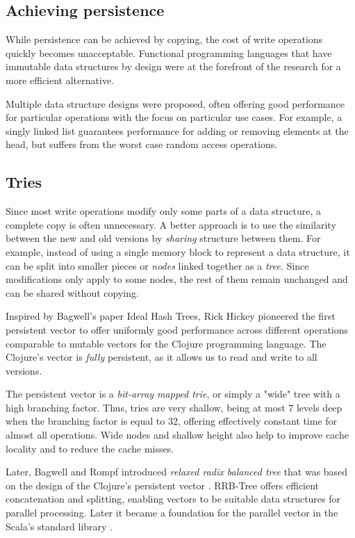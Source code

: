 \subsection{Achieving persistence}
While persistence can be achieved by copying, the cost of write operations quickly becomes unacceptable. Functional programming languages that have immutable data structures by design were at the forefront of the research for a more efficient alternative.

Multiple data structure designs were proposed, often offering good performance for particular operations with the focus on particular use cases. For example, a singly linked list guarantees  performance for adding or removing elements at the head, but suffers from the worst case  random access operations.

\subsection{Tries}
Since most write operations modify only some parts of a data structure, a complete copy is often unnecessary. A better approach is to use the similarity between the new and old versions by \emph{sharing} structure between them. For example, instead of using a single memory block to represent a data structure, it can be split into smaller pieces or \emph{nodes} linked together as a \emph{tree}. Since modifications only apply to some nodes, the rest of them remain unchanged and can be shared without copying.

Inspired by Bagwell's paper Ideal Hash Trees\cite{ideal-hash-trees}, Rick Hickey pioneered the first persistent vector to offer uniformly good performance across different operations comparable to mutable vectors for the Clojure programming language. The Clojure's vector is \emph{fully} persistent, as it allows us to read and write to all versions.

The persistent vector is a \emph{bit-array mapped trie}, or simply a "wide" tree with a high branching factor. Thus, tries are very shallow, being at most 7 levels deep when the branching factor is equal to 32, offering effectively constant time for almost all operations. Wide nodes and shallow height also help to improve cache locality and to reduce the cache misses.

Later, Bagwell and Rompf introduced \emph{relaxed radix balanced tree} that was based on the design of the Clojure's persistent vector \cite{efficient-immutable-vectors}. RRB-Tree offers efficient concatenation and splitting, enabling vectors to be suitable data structures for parallel processing. Later it became a foundation for the parallel vector in the Scala's standard library \cite{rrb-vector-practical-general-purpose-im-sequence}.


